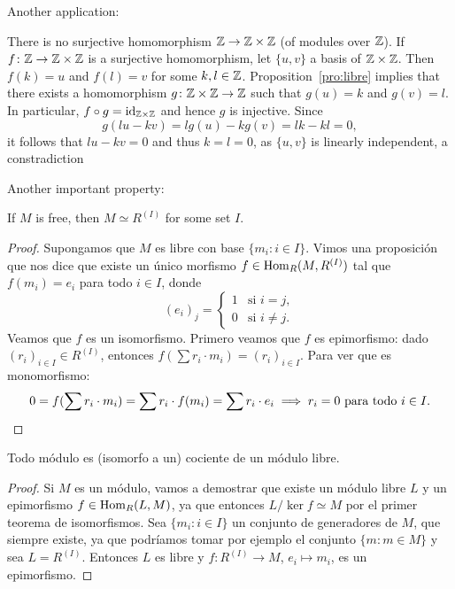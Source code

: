 Another application:

\begin{example}
There is no surjective homomorphism $\mathbb{Z}\to\mathbb{Z}\times\mathbb{Z}$ (of modules over $\mathbb{Z}$). 
If $f\colon\mathbb{Z}\to\mathbb{Z}\times\mathbb{Z}$ is a surjective homomorphism, 
let $\{u,v\}$ a basis of $\mathbb{Z}\times\mathbb{Z}$. Then $f(k)=u$ and $f(l)=v$ for some $k,l\in\mathbb{Z}$. Proposition~\ref{pro:libre} implies 
that there exists a homomorphism $g\colon\mathbb{Z}\times\mathbb{Z}\to\mathbb{Z}$ such that $g(u)=k$ and $g(v)=l$. 
In particular, $f\circ g=\operatorname{id}_{\mathbb{Z}\times\mathbb{Z}}$ and hence 
$g$ is injective. Since  
\[
g(lu-kv)=lg(u)-kg(v)=lk-kl=0,
\]
it follows that $lu-kv=0$ and thus $k=l=0$, as $\{u,v\}$ is linearly independent, a constradiction
\end{example}

Another important property:

\begin{proposition}
If $M$ is free, then $M\simeq R^{(I)}$ for some set $I$.
\end{proposition}

\begin{proof}
Supongamos que $M$ es libre con base $\{m_i:i\in I\}$. Vimos una proposición que nos dice que 
existe un único morfismo $f\in\operatorname{Hom}_R(M,R^{(I)})$ tal que 
$f(m_i)=e_i$ para todo $i\in I$, donde 
\[
(e_i)_j=\begin{cases}
	1 & \text{si $i=j$},\\
	0 & \text{si $i\ne j$.}
	\end{cases}	
\]	
Veamos que $f$ es un isomorfismo. 
Primero veamos que $f$ es epimorfismo: dado $(r_i)_{i\in I}\in R^{(I)}$, entonces
$f(\sum r_i\cdot m_i)=(r_i)_{i\in I}$. Para ver que es monomorfismo:
\[
0=f(\sum r_i\cdot m_i)=\sum r_i\cdot f(m_i)=\sum r_i\cdot e_i\implies r_i=0\text{ para todo $i\in I$}.\qedhere
\]
\end{proof}

\begin{corollary}
Todo módulo es (isomorfo a un) cociente de un módulo libre.
\end{corollary}

\begin{proof}
Si $M$ es un módulo, vamos a demostrar que existe un módulo libre $L$ y un epimorfismo $f\in\operatorname{Hom}_R(L,M)$, ya que
entonces $L/\ker f\simeq M$ por el primer teorema de isomorfismos. Sea 
$\{m_i:i\in I\}$ un conjunto de generadores de $M$, que siempre existe, ya que podríamos tomar por ejemplo el conjunto
$\{m:m\in M\}$ y sea $L=R^{(I)}$. Entonces $L$ es libre y $f\colon R^{(I)}\to M$, $e_i\mapsto m_i$, es un epimorfismo. 
\end{proof}

